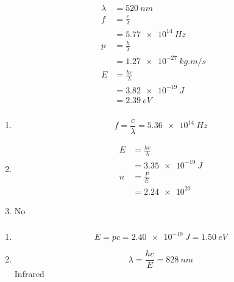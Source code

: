 \documentclass{article}
\begin{document}
\begin{align*}
  \lambda & = \qty{520}{nm}          \\
  f       & = \frac{c}{\lambda}      \\
          & = \qty{5.77e14}{Hz}      \\
  p       & = \frac{h}{\lambda}      \\
          & = \qty{1.27e-27}{kg.m/s} \\
  E       & = \frac{h c}{\lambda}    \\
          & = \qty{3.82e-19}{J}      \\
          & = \qty{2.39}{eV}
\end{align*}

\setcounter{subsubsection}{2}
\subsubsection{}

\begin{enumerate}
  \item \[f = \frac{c}{\lambda} = \qty{5.36e14}{Hz}\]

  \item

        \begin{align*}
          E & = \frac{h c}{\lambda} \\
            & = \qty{3.35e-19}{J}   \\
          n & = \frac{P}{E}         \\
            & = \num{2.24e20}
        \end{align*}

  \item No
\end{enumerate}

\setcounter{subsubsection}{4}
\subsubsection{}

\begin{enumerate}
  \item \[E = p c = \qty{2.40e-19}{J} = \qty{1.50}{eV}\]

  \item \[\lambda = \frac{h c}{E} = \qty{828}{nm}\] Infrared
\end{enumerate}

\setcounter{subsubsection}{6}
\subsubsection{}
\end{document}
